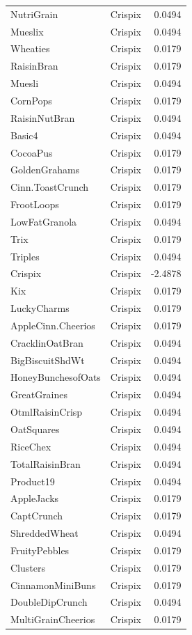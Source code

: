 \begin{longtable}{llr}
NutriGrain & Crispix & 0.0494 \\
Mueslix & Crispix & 0.0494 \\
Wheaties & Crispix & 0.0179 \\
RaisinBran & Crispix & 0.0179 \\
Muesli & Crispix & 0.0494 \\
CornPops & Crispix & 0.0179 \\
RaisinNutBran & Crispix & 0.0494 \\
Basic4 & Crispix & 0.0494 \\
CocoaPus & Crispix & 0.0179 \\
GoldenGrahams & Crispix & 0.0179 \\
Cinn.ToastCrunch & Crispix & 0.0179 \\
FrootLoops & Crispix & 0.0179 \\
LowFatGranola & Crispix & 0.0494 \\
Trix & Crispix & 0.0179 \\
Triples & Crispix & 0.0494 \\
Crispix & Crispix & -2.4878 \\
Kix & Crispix & 0.0179 \\
LuckyCharms & Crispix & 0.0179 \\
AppleCinn.Cheerios & Crispix & 0.0179 \\
CracklinOatBran & Crispix & 0.0494 \\
BigBiscuitShdWt & Crispix & 0.0494 \\
HoneyBunchesofOats & Crispix & 0.0494 \\
GreatGraines & Crispix & 0.0494 \\
OtmlRaisinCrisp & Crispix & 0.0494 \\
OatSquares & Crispix & 0.0494 \\
RiceChex & Crispix & 0.0494 \\
TotalRaisinBran & Crispix & 0.0494 \\
Product19 & Crispix & 0.0494 \\
AppleJacks & Crispix & 0.0179 \\
CaptCrunch & Crispix & 0.0179 \\
ShreddedWheat & Crispix & 0.0494 \\
FruityPebbles & Crispix & 0.0179 \\
Clusters & Crispix & 0.0179 \\
CinnamonMiniBuns & Crispix & 0.0179 \\
DoubleDipCrunch & Crispix & 0.0494 \\
MultiGrainCheerios & Crispix & 0.0179 \\

\end{longtable}
